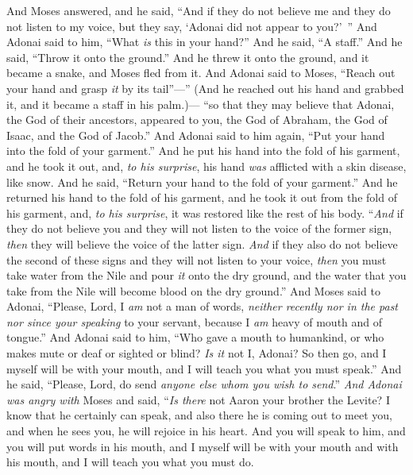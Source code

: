 \begin{biblechapter} %
 And Moses answered, and he said, “And if they do not believe me and they do not listen to my voice, but they say, ‘Adonai did not appear to you?’ ”
\verse And Adonai said to him, “What \textit{is} this in your hand?” And he said, “A staff.”
\verse And he said, “Throw it onto the ground.” And he threw it onto the ground, and it became a snake, and Moses fled from it.
\verse And Adonai said to Moses, “Reach out your hand and grasp \textit{it} by its tail”—” (And he reached out his hand and grabbed it, and it became a staff in his palm.)—
\verse “so that they may believe that Adonai, the God of their ancestors, appeared to you, the God of Abraham, the God of Isaac, and the God of Jacob.”
\verse And Adonai said to him again, “Put your hand into the fold of your garment.” And he put his hand into the fold of his garment, and he took it out, and, \textit{to his surprise}, his hand \textit{was} afflicted with a skin disease, like snow.
\verse And he said, “Return your hand to the fold of your garment.” And he returned his hand to the fold of his garment, and he took it out from the fold of his garment, and, \textit{to his surprise}, it was restored like the rest of his body.
\verse “\textit{And} if they do not believe you and they will not listen to the voice of the former sign, \textit{then} they will believe the voice of the latter sign.
\verse \textit{And} if they also do not believe the second of these signs and they will not listen to your voice, \textit{then} you must take water from the Nile and pour \textit{it} onto the dry ground, and the water that you take from the Nile will become blood on the dry ground.”
\verse And Moses said to Adonai, “Please, Lord, I \textit{am} not a man of words, \textit{neither recently nor in the past nor since your speaking} to your servant, because I \textit{am} heavy of mouth and of tongue.”
\verse And Adonai said to him, “Who gave a mouth to humankind, or who makes mute or deaf or sighted or blind? \textit{Is it} not I, Adonai?
\verse So then go, and I myself will be with your mouth, and I will teach you what you must speak.”
\verse And he said, “Please, Lord, do send \textit{anyone else whom you wish to send}.”
\verse \textit{And Adonai was angry with} Moses and said, “\textit{Is there} not Aaron your brother the Levite? I know that he certainly can speak, and also there he is coming out to meet you, and when he sees you, he will rejoice in his heart.
\verse And you will speak to him, and you will put words in his mouth, and I myself will be with your mouth and with his mouth, and I will teach you what you must do.

\end{biblechapter}
